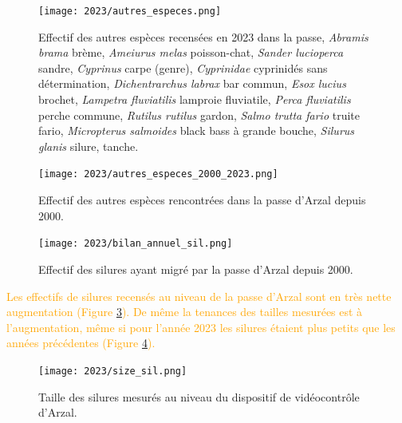 \documentclass[11pt,twocolumn,titlepage,twoside]{article}\usepackage[]{graphicx}\usepackage[]{color}
\newcommand{\rev}[2][orange]{\textcolor{#1}{#2}}
\begin{document}
\begin{figure}[htpb]
\centering
\texttt{[image: 2023/autres\_especes.png]} 
\caption{Effectif des autres espèces recensées en 2023 dans la passe,
\textit{Abramis brama} brème, 
\textit{Ameiurus melas} poisson-chat,
\textit{Sander lucioperca} sandre,
\textit{Cyprinus} carpe (genre), \textit{Cyprinidae} cyprinidés sans détermination,
\textit{Dichentrarchus labrax} bar commun,
\textit{Esox lucius} brochet,
\textit{Lampetra fluviatilis} lamproie fluviatile,
\textit{Perca fluviatilis} perche commune,
\textit{Rutilus rutilus} gardon,
\textit{Salmo trutta fario} truite fario,
\textit{Micropterus salmoides} black bass à grande bouche, 
\textit{Silurus glanis} silure,
 tanche.}
\label{autres_especes}
\end{figure}



\begin{figure}[htpb]
\centering
\texttt{[image: 2023/autres\_especes\_2000\_2023.png]} 
\caption{Effectif des autres espèces rencontrées dans la passe d'Arzal depuis
2000.}
\label{autres_especes_2000_2023}
\end{figure}


\begin{figure}[htpb]
\centering
\texttt{[image: 2023/bilan\_annuel\_sil.png]} 
\caption{Effectif des silures ayant migré par la passe d'Arzal depuis
2000.}
\label{bilan_annuel_sil}
\end{figure}


\rev{Les effectifs de silures recensés au niveau de la passe d'Arzal sont en très
nette augmentation (Figure \ref{bilan_annuel_sil}). De même la tenances des
tailles mesurées est à l'augmentation, même si pour l'année 2023 les silures
étaient plus petits que les années précédentes (Figure \ref{size_sil}).}

\begin{figure}[htpb]
\centering
\texttt{[image: 2023/size\_sil.png]} 
\caption{Taille des silures mesurés au niveau du dispositif de vidéocontrôle
d'Arzal.}
\label{size_sil}
\end{figure}


\end{document}
